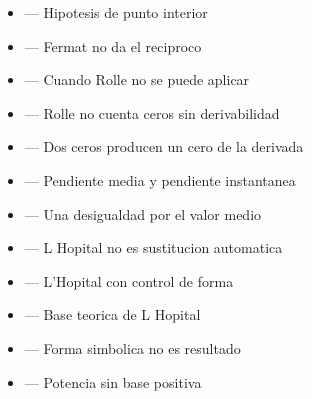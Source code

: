 \documentclass[10pt,a4paper,oneside,openany]{book}
\begin{document}
\begin{itemize}
\item {} — Hipotesis de punto interior
\item {} — Fermat no da el reciproco
\item {} — Cuando Rolle no se puede aplicar
\item {} — Rolle no cuenta ceros sin derivabilidad
\item {} — Dos ceros producen un cero de la derivada
\item {} — Pendiente media y pendiente instantanea
\item {} — Una desigualdad por el valor medio
\item {} — L Hopital no es sustitucion automatica
\item {} — L'Hopital con control de forma
\item {} — Base teorica de L Hopital
\item {} — Forma simbolica no es resultado
\item {} — Potencia sin base positiva
\end{itemize}
\end{document}
